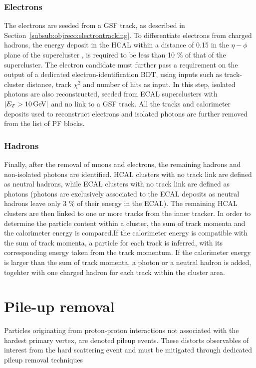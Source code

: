 \subsubsection{Electrons}
The electrons are seeded from a GSF track, as described in Section~\ref{subsub:objreco:electrontracking}. To differentiate electrons from charged hadrons, the energy deposit in the HCAL within a distance of 0.15 in the $\eta-\phi$ plane of the supercluster , is required to be less than 10 \% of that of the supercluster. The electron candidate must further pass a requirement on the output of a dedicated electron-identification BDT, using inputs such as track-cluster distance, track $\chi^2$ and number of hits as input.  In this step, isolated photons are also reconstructed, seeded from ECAL superclusters with $|E_T>10 \,\text{Ge\hspace{-.08em}V}|$ and no link to a GSF track.
All the tracks and calorimeter deposits used to reconstruct electrons and isolated photons are further removed from the list of PF blocks.

\subsubsection{Hadrons}
Finally, after the removal of muons and electrons, the remaining hadrons and non-isolated photons are identified. HCAL clusters with no track link are defined as neutral hadrons, while ECAL clusters with no track link are defined as photons (photons are exclusively associated to the ECAL deposits as neutral hadrons leave only 3 \% of their energy in the ECAL).
The remaining HCAL clusters are then linked to one or more tracks from the inner tracker. In order to determine the particle content within a cluster, the sum of track momenta and the calorimeter energy is compared.If the calorimeter energy is compatible with the sum of track momenta, a particle for each track is inferred, with its corresponding energy taken from the track momentum.  If the calorimeter energy is larger than the sum of track momenta, a photon or a neutral hadron is added, togehter with one charged hadron for each track within the cluster area.

\section{Pile-up removal}

Particles originating from proton-proton interactions not associated with the hardest primary vertex, are denoted pileup events.
These distorts observables of interest from the hard scattering event and must be mitigated through dedicated pileup removal techniques


